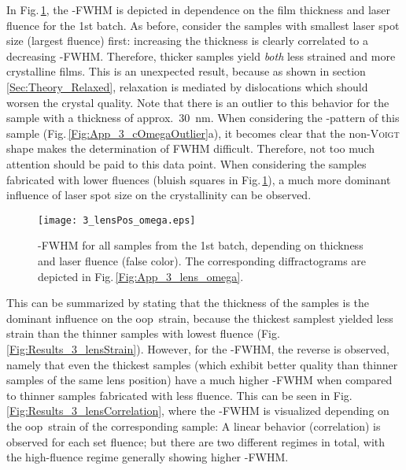 In Fig.\,\ref{Fig:Results_3_lensOmega}, the \textomega-FWHM is depicted in dependence on the film thickness and laser fluence for the 1st batch.
As before, consider the samples with smallest laser spot size (largest fluence) first:
increasing the thickness is clearly correlated to a decreasing \textomega-FWHM.
Therefore, thicker samples yield \emph{both} less strained and more crystalline films.
This is an unexpected result, because as shown in section \ref{Sec:Theory_Relaxed}, relaxation is mediated by dislocations which should worsen the crystal quality.
Note that there is an outlier to this behavior for the sample with a thickness of approx.\ \qty{30}{\nm}.
When considering the \textomega-pattern of this sample (Fig.\,\ref{Fig:App_3_cOmegaOutlier}a), it becomes clear that the non-\textsc{Voigt} shape makes the determination of \gls{FWHM} difficult.
Therefore, not too much attention should be paid to this data point.
When considering the samples fabricated with lower fluences (bluish squares in Fig.\,\ref{Fig:Results_3_lensOmega}), a much more dominant influence of laser spot size on the crystallinity can be observed.
\begin{figure}
    \centering
    \texttt{[image: 3\_lensPos\_omega.eps]}
    \caption{
        \textomega-FWHM for all samples from the 1st batch, depending on thickness and laser fluence (false color).
        The corresponding diffractograms are depicted in Fig.\,\ref{Fig:App_3_lens_omega}.
    }
    \label{Fig:Results_3_lensOmega}
\end{figure}
This can be summarized by stating that the thickness of the samples is the dominant influence on the \gls{oop}\ strain, because the thickest samplest yielded less strain than the thinner samples with lowest fluence (Fig.\,\ref{Fig:Results_3_lensStrain}).
However, for the \textomega-FWHM, the reverse is observed, namely that even the thickest samples (which exhibit better quality than thinner samples of the same lens position) have a much higher \textomega-FWHM when compared to thinner samples fabricated with less fluence.
This can be seen in Fig.\,\ref{Fig:Results_3_lensCorrelation}, where the \textomega-FWHM is visualized depending on the \gls{oop}\ strain of the corresponding sample:
A linear behavior (correlation) is observed for each set fluence; but there are two different regimes in total, with the high-fluence regime generally showing higher \textomega-FWHM.
